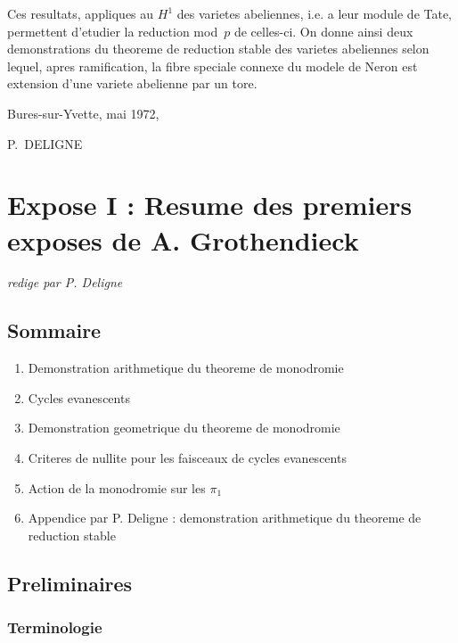 Ces resultats, appliques au $H^1$ des varietes abeliennes, i.e. a leur module de Tate, permettent d'etudier la reduction mod~$p$ de celles-ci. On donne ainsi deux demonstrations du theoreme de reduction stable des varietes abeliennes selon lequel, apres ramification, la fibre speciale connexe du modele de Neron est extension d'une variete abelienne par un tore.

\medskip
\hfill Bures-sur-Yvette, mai 1972,

\hfill P.~DELIGNE



\section{Expose I : Resume des premiers exposes de A. Grothendieck}
\label{sec:exposeI}

\begin{flushright}
\textit{redige par P. Deligne}
\end{flushright}

\subsection*{Sommaire}
\begin{enumerate}[label=\arabic*.]
\item Demonstration arithmetique du theoreme de monodromie
\item Cycles evanescents
\item Demonstration geometrique du theoreme de monodromie
\item Criteres de nullite pour les faisceaux de cycles evanescents
\item Action de la monodromie sur les $\pi_1$
\item Appendice par P. Deligne : demonstration arithmetique du theoreme de reduction stable
\end{enumerate}

\subsection{Preliminaires}
\label{subsec:preliminaires}

\subsubsection{Terminologie}
\label{subsubsec:terminologie}

